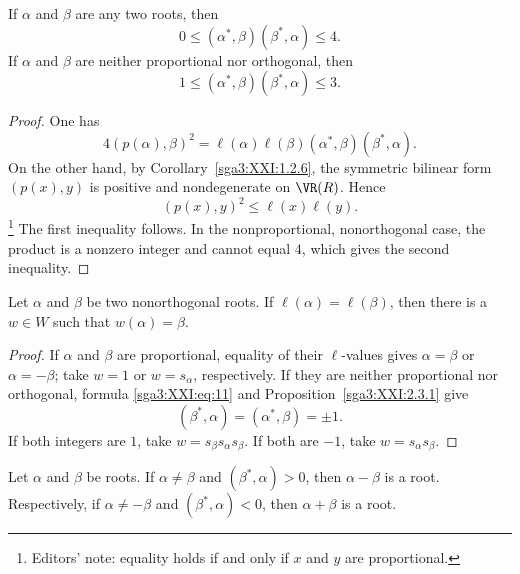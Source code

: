 \begin{proposition}\label{sga3:XXI:2.3.1}
If \(\alpha\) and \(\beta\) are any two roots, then
\begin{equation}
 0\leq(\alpha^\ast,\beta)(\beta^\ast,\alpha)\leq4.
 \tag{13}\label{sga3:XXI:eq:13}
\end{equation}
If \(\alpha\) and \(\beta\) are neither proportional nor orthogonal,
then
\[
 1\leq(\alpha^\ast,\beta)(\beta^\ast,\alpha)\leq3.
\]
\end{proposition}

\begin{proof}
One has
\[
 4(p(\alpha),\beta)^2
 =\ell(\alpha)\ell(\beta)
   (\alpha^\ast,\beta)(\beta^\ast,\alpha).
\]
On the other hand, by Corollary~\ref{sga3:XXI:1.2.6}, the symmetric
bilinear form \((p(x),y)\) is positive and nondegenerate on
\(\VR(R)\). Hence
\[
 (p(x),y)^2\leq\ell(x)\ell(y).
\]
\footnote{Editors' note: equality holds if and only if \(x\) and
\(y\) are proportional.}
The first inequality follows. In the nonproportional, nonorthogonal
case, the product is a nonzero integer and cannot equal \(4\), which
gives the second inequality.
\end{proof}

\begin{corollary}\label{sga3:XXI:2.3.2}
Let \(\alpha\) and \(\beta\) be two nonorthogonal roots. If
\(\ell(\alpha)=\ell(\beta)\), then there is a \(w\in W\) such that
\(w(\alpha)=\beta\).
\end{corollary}

\begin{proof}
If \(\alpha\) and \(\beta\) are proportional, equality of their
\(\ell\)-values gives \(\alpha=\beta\) or \(\alpha=-\beta\); take
\(w=1\) or \(w=s_\alpha\), respectively. If they are neither
proportional nor orthogonal, formula \eqref{sga3:XXI:eq:11} and
Proposition~\ref{sga3:XXI:2.3.1} give
\[
 (\beta^\ast,\alpha)=(\alpha^\ast,\beta)=\pm1.
\]
If both integers are \(1\), take \(w=s_\beta s_\alpha s_\beta\). If
both are \(-1\), take \(w=s_\alpha s_\beta\).
\end{proof}

\begin{corollary}\label{sga3:XXI:2.3.3}
Let \(\alpha\) and \(\beta\) be roots. If
\(\alpha\neq\beta\) and \((\beta^\ast,\alpha)>0\), then
\(\alpha-\beta\) is a root. Respectively, if
\(\alpha\neq-\beta\) and \((\beta^\ast,\alpha)<0\), then
\(\alpha+\beta\) is a root.
\end{corollary}

